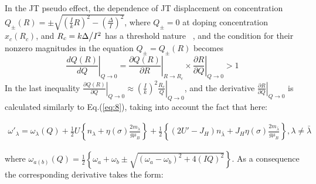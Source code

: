 \documentclass[%
 reprint,
groupedaddress,
 amsmath,amssymb,
 aps,
prb,
]{revtex4-1}
\begin{document}
In the JT pseudo effect, the dependence of JT displacement on concentration $Q_ \pm  \left( R \right) =  \pm \sqrt {\left( {\frac{I}{k}R} \right)^2  - \left( {\frac{\Delta }{I}} \right)^2 }$, where $Q_ \pm   = 0$ at doping concentration $x_c \left( {R_c } \right)$, and $R_c  = {{k\Delta } \mathord{\left/
 {\vphantom {{k\Delta } {I^2 }}} \right.
 \kern-\nulldelimiterspace} {I^2 }}$ has a threshold nature ~\cite{Gavrichkov2022}, and the condition for their nonzero magnitudes in  the equation $Q_ \pm   = Q_ \pm  \left( R \right)$  becomes
\begin{equation}
\left. {\frac{{dQ\left( R \right)}}{{dQ}}} \right|_{Q \to 0}  = \left. {\frac{{\partial Q\left( R \right)}}{{\partial R}}} \right|_{R \to R_c }  \times \left. {\frac{{\partial R}}{{\partial Q}}} \right|_{Q \to 0}  > 1
\label{eq:10}
\end{equation}
In the last inequality  $\left. {\frac{{\partial Q\left( R \right)}}{{\partial Q}}} \right|_{Q \to 0}  \approx \left. {\left( {\frac{I}{k}} \right)^2 \frac{{R_c }}{Q}} \right|_{Q \to 0}$,  and the derivative  $\left. {\frac{{\partial R}}{{\partial Q}}} \right|_{Q \to 0}$ is calculated similarly to Eq.(\ref{eq:8}), taking into account the fact that here:
\begin{widetext}
\begin{eqnarray}
\omega '_\lambda   = \omega _\lambda(Q) + \frac{1}{2}U\left\{ {n_\lambda   + \eta \left( \sigma  \right)\frac{{2m_\lambda  }}{{g\mu _B }}} \right\} + \frac{1}{2}\left\{ {\left( {2U' - J_H } \right)n_{\bar \lambda }  + J_H \eta \left( \sigma  \right)\frac{{2m_{\bar \lambda } }}{{g\mu _B }}} \right\}, \lambda  \ne \bar \lambda
\label{eq:11}
\end{eqnarray}
\end{widetext}
where $\omega _{a\left( b \right)} \left( Q \right) = \frac{1}{2}\left\{ {\omega _a  + \omega _b  \pm \sqrt {\left( {\omega _a  - \omega _b } \right)^2  + 4\left( {IQ} \right)^2 } } \right\}$. As a consequence the corresponding derivative takes the form:
\end{document}
